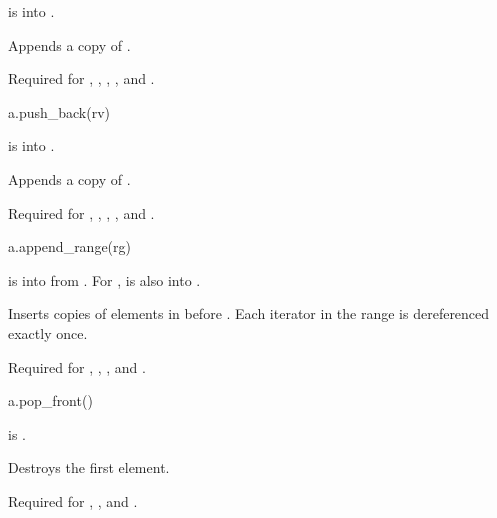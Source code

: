 \begin{itemdescr}
\pnum
\result
{}

\pnum
\expects
{} is  into .

\pnum
\effects
Appends a copy of .

\pnum
\remarks
Required for
,
,
,
, and
.
\end{itemdescr}

\begin{itemdecl}
a.push_back(rv)
\end{itemdecl}

\begin{itemdescr}
\pnum
\result
{}

\pnum
\expects
{} is  into .

\pnum
\effects
Appends a copy of .

\pnum
\remarks
Required for
,
,
,
, and
.
\end{itemdescr}

\begin{itemdecl}
a.append_range(rg)
\end{itemdecl}

\begin{itemdescr}
\pnum
\result
{}

\pnum
\expects
{} is  into 
from .
For ,
 is also
 into .

\pnum
\effects
Inserts copies of elements in  before .
Each iterator in the range  is dereferenced exactly once.

\pnum
\remarks
Required for
,
,
, and
.
\end{itemdescr}

\begin{itemdecl}
a.pop_front()
\end{itemdecl}

\begin{itemdescr}
\pnum
\result
{}

\pnum
\hardexpects
{} is .

\pnum
\effects
Destroys the first element.

\pnum
\remarks
Required for
,
, and
.
\end{itemdescr}

